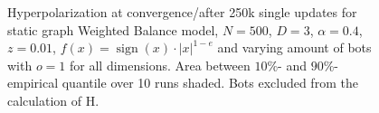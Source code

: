 \documentclass[11pt]{article}
\DeclareMathOperator{\sign}{sign}
\begin{document}
\begin{figure}[!htb]
\begin{center}
\end{center}
\caption{
Hyperpolarization at convergence/after 250k single updates for static graph Weighted Balance model, $N=500$, $D=3$, $\alpha=0.4$, $z=0.01$, $f(x)=\sign(x)\cdot|x|^{1-e}$ and varying amount of bots with $o=1$ for all dimensions. Area between $10\%$- and $90\%$- empirical quantile over 10 runs shaded. Bots excluded from the calculation of H.
}
\end{figure}
\end{document}
